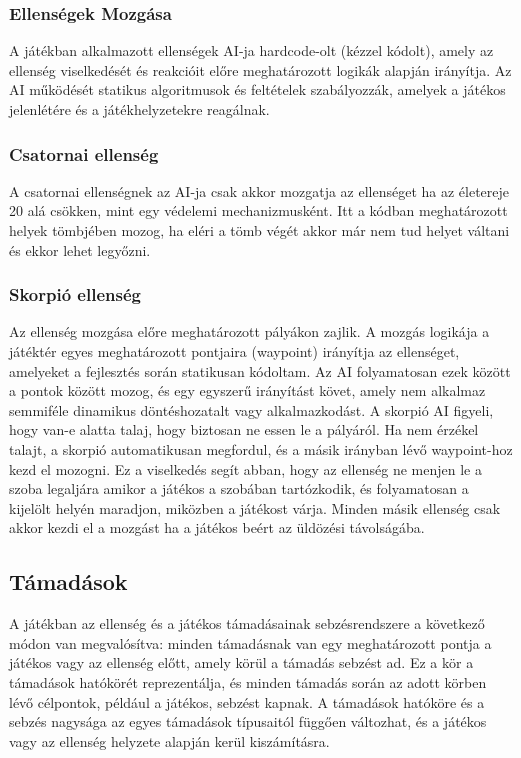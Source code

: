 \documentclass[
]{thesis-ekf}
\theoremstyle{definition}
\theoremstyle{remark}
\begin{document}
\subsubsection{Ellenségek Mozgása}
A játékban alkalmazott ellenségek AI-ja hardcode-olt (kézzel kódolt), amely az ellenség viselkedését és reakcióit előre meghatározott logikák alapján irányítja. Az AI működését statikus algoritmusok és feltételek szabályozzák, amelyek a játékos jelenlétére és a játékhelyzetekre reagálnak.
\subsubsection{Csatornai ellenség}
A csatornai ellenségnek az AI-ja csak akkor mozgatja az ellenséget ha az életereje 20 alá csökken, mint egy védelemi mechanizmusként. Itt a kódban meghatározott helyek tömbjében mozog, ha eléri a tömb végét akkor már nem tud helyet váltani és ekkor lehet legyőzni.
\subsubsection{Skorpió ellenség}
Az ellenség mozgása előre meghatározott pályákon zajlik. A mozgás logikája a játéktér egyes meghatározott pontjaira (waypoint) irányítja az ellenséget, amelyeket a fejlesztés során statikusan kódoltam. Az AI folyamatosan ezek között a pontok között mozog, és egy egyszerű irányítást követ, amely nem alkalmaz semmiféle dinamikus döntéshozatalt vagy alkalmazkodást.
A skorpió AI figyeli, hogy van-e alatta talaj, hogy biztosan ne essen le a pályáról. Ha nem érzékel talajt, a skorpió automatikusan megfordul, és a másik irányban lévő waypoint-hoz kezd el mozogni. Ez a viselkedés segít abban, hogy az ellenség ne menjen le a szoba legaljára amikor a játékos a szobában tartózkodik, és folyamatosan a kijelölt helyén maradjon, miközben a játékost várja.
Minden másik ellenség csak akkor kezdi el a mozgást ha a játékos beért az üldözési távolságába.
\subsection{Támadások}
A játékban az ellenség és a játékos támadásainak sebzésrendszere a következő módon van megvalósítva: minden támadásnak van egy meghatározott pontja a játékos vagy az ellenség előtt, amely körül a támadás sebzést ad. Ez a kör a támadások hatókörét reprezentálja, és minden támadás során az adott körben lévő célpontok, például a játékos, sebzést kapnak. A támadások hatóköre és a sebzés nagysága az egyes támadások típusaitól függően változhat, és a játékos vagy az ellenség helyzete alapján kerül kiszámításra.
\end{document}

